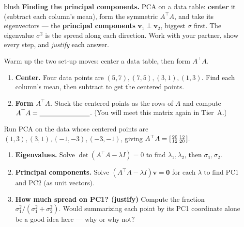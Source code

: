 \documentclass[10pt]{article}
\newcommand{\vv}{\mathbf{v}}
\newcommand{\zero}{\mathbf{0}}
\newcommand{\T}{^{\top}}
\begin{document}
\namepartnerperiod

\vspace{0.10in}

\begin{headlinebox}{blush}
\small\textbf{Finding the principal components.} PCA on a data table: \textbf{center} it (subtract each
column's mean), form the symmetric $A\T A$, and take its eigenvectors --- the \textbf{principal components}
$\vv_1\perp\vv_2$, biggest $\sigma$ first. The eigenvalue $\sigma^2$ is the spread along each direction. Work
with your partner, show every step, and \emph{justify} each answer.
\end{headlinebox}

\vspace{0.08in}

\begin{tcolorbox}[colback=white, colframe=black!40, title=\textbf{Tier R --- Remediate},
    fonttitle=\bfseries, arc=1.5mm, left=3mm, right=3mm, top=2mm, bottom=2mm, breakable]
Warm up the two set-up moves: center a data table, then form $A\T A$.
\begin{enumerate}[leftmargin=1.7em, itemsep=9pt]
  \item \textbf{Center.} Four data points are $(5,7),(7,5),(3,1),(1,3)$. Find each column's mean, then subtract to get the centered points. \writeline
  \item \textbf{Form $A\T A$.} Stack the centered points as the rows of $A$ and compute $A\T A=\blank{2.6cm}$. (You will meet this matrix again in Tier~A.) \writeline
\end{enumerate}
\end{tcolorbox}

\begin{tcolorbox}[colback=white, colframe=black!40, title=\textbf{Tier A --- Approaching Proficiency},
    fonttitle=\bfseries, arc=1.5mm, left=3mm, right=3mm, top=2mm, bottom=2mm, breakable]
Run PCA on the data whose centered points are $(1,3),(3,1),(-1,-3),(-3,-1)$, giving
$A\T A=\begin{bsmallmatrix} 20 & 12\\ 12 & 20 \end{bsmallmatrix}$.
\begin{enumerate}[leftmargin=1.7em, itemsep=9pt]
  \item \textbf{Eigenvalues.} Solve $\det(A\T A-\lambda I)=0$ to find $\lambda_1,\lambda_2$, then $\sigma_1,\sigma_2$. \writeline
  \item \textbf{Principal components.} Solve $(A\T A-\lambda I)\vv=\zero$ for each $\lambda$ to find PC1 and PC2 (as unit vectors). 
  \item \textbf{How much spread on PC1? (justify)} Compute the fraction $\sigma_1^2/(\sigma_1^2+\sigma_2^2)$. Would summarizing each point by its PC1 coordinate alone be a good idea here --- why or why not? \writeline
\end{enumerate}
\end{tcolorbox}
\end{document}
